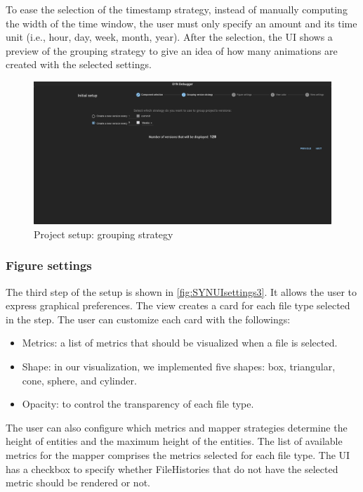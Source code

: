 To ease the selection of the timestamp strategy, instead of manually computing the width of the time window, the user must only specify an amount and its time unit (i.e., hour, day, week, month, year). After the selection, the UI shows a preview of the grouping strategy to give an idea of how many animations are created with the selected settings. 
\begin{figure}
    \center
    \includegraphics[width=\textwidth]{SYNUI-settings2.png}
    \caption{Project setup: grouping strategy}
    \label{fig:SYNUIsettings2}
\end{figure}

\subsubsection*{Figure settings}
The third step of the setup is shown in \autoref{fig:SYNUIsettings3}. It allows the user to express graphical preferences. 
The view creates a card for each file type selected in the  step.
The user can customize each card with the followings:
\begin{itemize}
    \item Metrics: a list of metrics that should be visualized when a file is selected. 
    \item Shape: in our visualization, we implemented five shapes: box, triangular, cone, sphere, and cylinder. 
    \item Opacity: to control the transparency of each file type.
\end{itemize}

The user can also configure which metrics and mapper strategies determine the height of entities and the maximum height of the entities. 
The list of available metrics for the mapper comprises the metrics selected for each file type.
The UI has a checkbox to specify whether FileHistories that do not have the selected metric should be rendered or not. 

